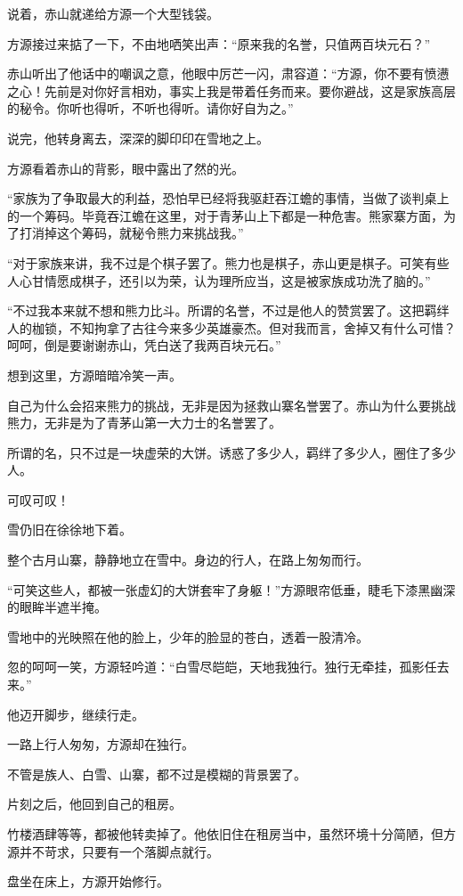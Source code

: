 \begin{this_body}
说着，赤山就递给方源一个大型钱袋。

方源接过来掂了一下，不由地哂笑出声：“原来我的名誉，只值两百块元石？”

赤山听出了他话中的嘲讽之意，他眼中厉芒一闪，肃容道：“方源，你不要有愤懑之心！先前是对你好言相劝，事实上我是带着任务而来。要你避战，这是家族高层的秘令。你听也得听，不听也得听。请你好自为之。”

说完，他转身离去，深深的脚印印在雪地之上。

方源看着赤山的背影，眼中露出了然的光。

“家族为了争取最大的利益，恐怕早已经将我驱赶吞江蟾的事情，当做了谈判桌上的一个筹码。毕竟吞江蟾在这里，对于青茅山上下都是一种危害。熊家寨方面，为了打消掉这个筹码，就秘令熊力来挑战我。”

“对于家族来讲，我不过是个棋子罢了。熊力也是棋子，赤山更是棋子。可笑有些人心甘情愿成棋子，还引以为荣，认为理所应当，这是被家族成功洗了脑的。”

“不过我本来就不想和熊力比斗。所谓的名誉，不过是他人的赞赏罢了。这把羁绊人的枷锁，不知拘拿了古往今来多少英雄豪杰。但对我而言，舍掉又有什么可惜？呵呵，倒是要谢谢赤山，凭白送了我两百块元石。”

想到这里，方源暗暗冷笑一声。

自己为什么会招来熊力的挑战，无非是因为拯救山寨名誉罢了。赤山为什么要挑战熊力，无非是为了青茅山第一大力士的名誉罢了。

所谓的名，只不过是一块虚荣的大饼。诱惑了多少人，羁绊了多少人，圈住了多少人。

可叹可叹！

雪仍旧在徐徐地下着。

整个古月山寨，静静地立在雪中。身边的行人，在路上匆匆而行。

“可笑这些人，都被一张虚幻的大饼套牢了身躯！”方源眼帘低垂，睫毛下漆黑幽深的眼眸半遮半掩。

雪地中的光映照在他的脸上，少年的脸显的苍白，透着一股清冷。

忽的呵呵一笑，方源轻吟道：“白雪尽皑皑，天地我独行。独行无牵挂，孤影任去来。”

他迈开脚步，继续行走。

一路上行人匆匆，方源却在独行。

不管是族人、白雪、山寨，都不过是模糊的背景罢了。

片刻之后，他回到自己的租房。

竹楼酒肆等等，都被他转卖掉了。他依旧住在租房当中，虽然环境十分简陋，但方源并不苛求，只要有一个落脚点就行。

盘坐在床上，方源开始修行。


\end{this_body}

